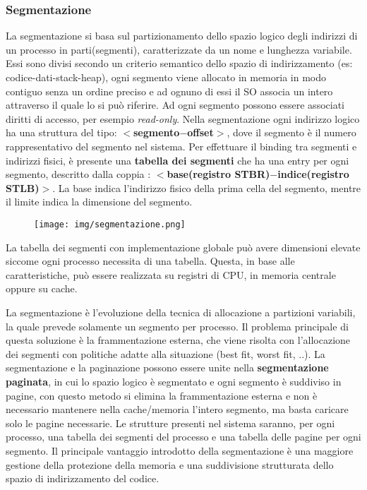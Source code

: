 \documentclass{article}
\begin{document}
 \subsubsection{Segmentazione}
 La segmentazione si basa sul partizionamento dello spazio logico degli indirizzi di un processo in parti(segmenti), caratterizzate da un nome e
 lunghezza variabile. Essi sono divisi secondo un criterio semantico dello spazio di indirizzamento 
 (es: codice-dati-stack-heap), ogni segmento viene allocato in memoria in modo contiguo senza un ordine preciso e ad ognuno di essi
  il SO associa un intero attraverso il quale lo si può riferire. Ad ogni segmento possono essere associati diritti di accesso, per esempio
  \textit{read-only}.
  Nella segmentazione ogni indirizzo logico ha una struttura del tipo: \textbf{$<$segmento$-$offset$>$}, dove il segmento è il numero rappresentativo 
  del segmento nel sistema. Per effettuare il binding tra segmenti e indirizzi fisici, è presente una \textbf{tabella dei segmenti}  che ha una entry
  per ogni segmento, descritto dalla coppia : \textbf{$<$base(registro STBR)$-$indice(registro STLB)$>$}. La base indica l'indirizzo fisico della prima cella del segmento,
  mentre il limite indica la dimensione del segmento.


 \begin{figure}[h!]
    \begin{center}
        \texttt{[image: img/segmentazione.png]}     
    \end{center}
\end{figure}

\noindent La tabella dei segmenti con implementazione globale può avere dimensioni elevate siccome ogni processo necessita di una tabella.
Questa, in base alle caratteristiche, può essere realizzata su registri di CPU, in memoria centrale oppure su cache.
\medskip

\noindent La segmentazione è l'evoluzione della tecnica di allocazione a partizioni variabili, la quale prevede solamente un segmento per processo.
Il problema principale di questa soluzione è la frammentazione esterna, che viene risolta con l'allocazione dei segmenti con
politiche adatte alla situazione (best fit, worst fit, ..).
La segmentazione e la paginazione possono essere unite nella \textbf{segmentazione paginata}, in cui lo spazio logico è segmentato e
ogni segmento è suddiviso in pagine, con questo metodo si elimina la frammentazione esterna e non è necessario mantenere nella cache/memoria l'intero
segmento, ma basta caricare solo le pagine necessarie. Le strutture presenti nel sistema saranno, per ogni processo, una tabella dei segmenti del processo
e una tabella delle pagine per ogni segmento.
Il principale vantaggio introdotto della segmentazione è una maggiore gestione della protezione della memoria e una suddivisione strutturata 
dello spazio di indirizzamento del codice. 
\end{document}
